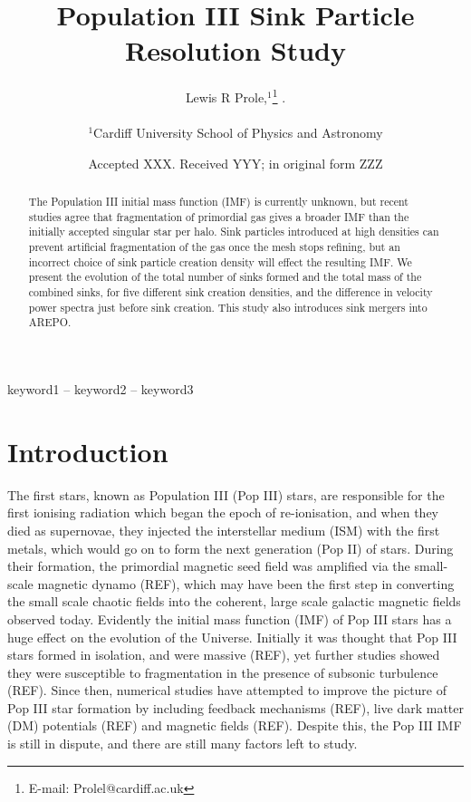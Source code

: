 \documentclass[fleqn,usenatbib]{mnras}
\title[Short title, max. 45 characters]{Population III Sink Particle Resolution Study}
\author[L. R. Prole]{
Lewis R Prole,$^{1}$\thanks{E-mail: Prolel@cardiff.ac.uk}
$.$
$$
$$
\\
$^{1}$Cardiff University School of Physics and Astronomy\\
$$
$$
}
\date{Accepted XXX. Received YYY; in original form ZZZ}
\begin{document}
\label{firstpage}
\pagerange{\pageref{firstpage}--\pageref{lastpage}}
\maketitle

\begin{abstract}
The Population III initial mass function (IMF) is currently unknown, but recent studies agree that fragmentation of primordial gas gives a broader IMF than the initially accepted singular star per halo. Sink particles introduced at high densities can prevent artificial fragmentation of the gas once the mesh stops refining, but an incorrect choice of sink particle creation density will effect the resulting IMF. We present the evolution of the  total number of sinks formed and the total mass of the combined sinks, for five different sink creation densities, and the difference in velocity power spectra just before sink creation. This study also introduces sink mergers into AREPO.
\end{abstract}

\begin{keywords}
keyword1 -- keyword2 -- keyword3
\end{keywords}



\section{Introduction}
The first stars, known as Population III (Pop III) stars, are responsible for the first ionising radiation which began the epoch of re-ionisation, and when they died as supernovae, they injected the interstellar medium (ISM) with the first metals, which would go on to form the next generation (Pop II) of stars. During their formation, the primordial magnetic seed field was amplified via the small-scale magnetic dynamo (REF), which may have been the first step in converting the small scale chaotic fields into the coherent, large scale galactic magnetic fields observed today. Evidently the initial mass function (IMF) of Pop III stars has a huge effect on the evolution of the Universe. Initially it was thought that Pop III stars formed in isolation, and were massive (REF), yet further studies showed they were susceptible to fragmentation in the presence of subsonic turbulence (REF). Since then, numerical studies have attempted to improve the picture of Pop III star formation by including feedback mechanisms (REF), live dark matter (DM) potentials (REF) and magnetic fields (REF). Despite this, the Pop III IMF is still in dispute, and there are still many factors left to study.
\end{document}
